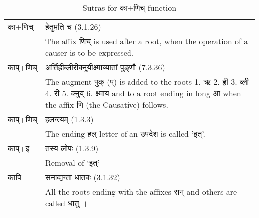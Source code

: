 		\begin{longtable}{ |p{1.6cm}|p{14.4cm}| } 
			\hline
			\rowcolor{red!10}
			
			\texthindi{का}+\texthindi{णिच्}
			&\texthindi{हेतुमति च} (3.1.26) \\
			\rowcolor{red!10}
			&The affix \texthindi{णिच्} is used after a root, when the operation of a causer is to be expressed.
			\\\hline
			\rowcolor{green!10}
			\texthindi{काप्}+\texthindi{णिच्}
			&\texthindi{अर्त्तिह्रीब्लीरीक्नूयीक्ष्माय्यातां पुङ्णौ} (7.3.36)\\
			\rowcolor{green!10}
			&The augment \texthindi{पुक् (प्)} is added to the roots 1. \texthindi{ऋ} 2. \texthindi{ह्री} 3. \texthindi{व्ली} 4. \texthindi{री} 5. \texthindi{क्नुय्} 6. \texthindi{क्ष्माय} and to a root ending in long \texthindi{आ} when the affix \texthindi{णि} (the Causative) follows.
			\\\hline
			\rowcolor{blue!10}
			\texthindi{काप्}+\texthindi{णिच्}
			&\texthindi{हलन्त्यम्} (1.3.3)\\
			\rowcolor{blue!10}
			&The ending \texthindi{हल्} letter of an \texthindi{उपदेश} is called '\texthindi{इत्}'.
			\\\hline
			\rowcolor{blue!10}
			\texthindi{काप्}+\texthindi{इ}
			&\texthindi{तस्य लोपः} (1.3.9)\\
			\rowcolor{blue!10}
			&Removal of ‘\texthindi{इत्}’
			\\\hline
			\rowcolor{yellow!10}
			\texthindi{कापि}
			&\texthindi{सनाद्यन्ता धातवः} (3.1.32) \\
			\rowcolor{yellow!10}
			&All the roots ending with the affixes \texthindi{सन्} and others are called \texthindi{धातु} । 
			\\\hline
		
		\caption{Sūtras for \texthindi{का$+$णिच्} function}
		\label{table:a6}
		\end{longtable}

